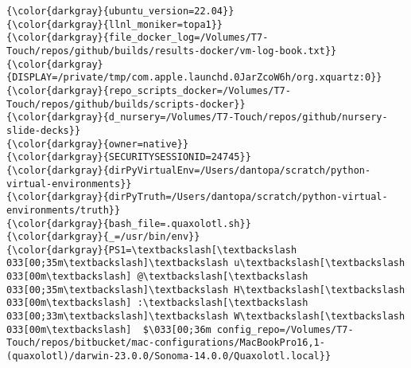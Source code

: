 {{\begin{Verbatim}[commandchars=\\\{\}]
{\color{darkgray}{ubuntu_version=22.04}}
{\color{darkgray}{llnl_moniker=topa1}}
{\color{darkgray}{file_docker_log=/Volumes/T7-Touch/repos/github/builds/results-docker/vm-log-book.txt}}
{\color{darkgray}{DISPLAY=/private/tmp/com.apple.launchd.0JarZcoW6h/org.xquartz:0}}
{\color{darkgray}{repo_scripts_docker=/Volumes/T7-Touch/repos/github/builds/scripts-docker}}
{\color{darkgray}{d_nursery=/Volumes/T7-Touch/repos/github/nursery-slide-decks}}
{\color{darkgray}{owner=native}}
{\color{darkgray}{SECURITYSESSIONID=24745}}
{\color{darkgray}{dirPyVirtualEnv=/Users/dantopa/scratch/python-virtual-environments}}
{\color{darkgray}{dirPyTruth=/Users/dantopa/scratch/python-virtual-environments/truth}}
{\color{darkgray}{bash_file=.quaxolotl.sh}}
{\color{darkgray}{_=/usr/bin/env}}
{\color{darkgray}{PS1=\textbackslash[\textbackslash 033[00;35m\textbackslash]\textbackslash u\textbackslash[\textbackslash 033[00m\textbackslash] @\textbackslash[\textbackslash 033[00;35m\textbackslash]\textbackslash H\textbackslash[\textbackslash 033[00m\textbackslash] :\textbackslash[\textbackslash 033[00;33m\textbackslash]\textbackslash W\textbackslash[\textbackslash 033[00m\textbackslash]  $\033[00;36m config_repo=/Volumes/T7-Touch/repos/bitbucket/mac-configurations/MacBookPro16,1-(quaxolotl)/darwin-23.0.0/Sonoma-14.0.0/Quaxolotl.local}}
\end{Verbatim}
}}

\endinput  %

